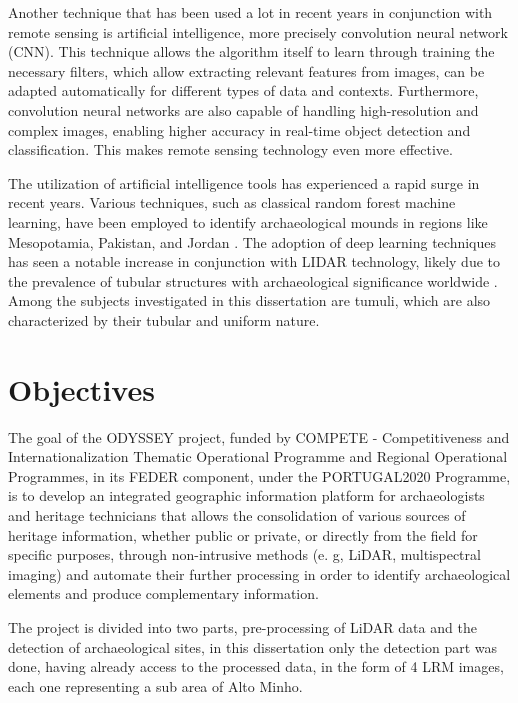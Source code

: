 Another technique that has been used a lot in recent years in conjunction with remote sensing is artificial intelligence, more precisely convolution neural network (CNN). This technique allows the algorithm itself to learn through training the necessary filters, which allow extracting relevant features from images, can be adapted automatically for different types of data and contexts. Furthermore, convolution neural networks are also capable of handling high-resolution and complex images, enabling higher accuracy in real-time object detection and classification. This makes remote sensing technology even more effective.




The utilization of artificial intelligence tools has experienced a rapid surge in recent years\cite{aumentoexpDL}. Various techniques, such as classical random forest machine learning, have been employed to identify archaeological mounds in regions like Mesopotamia, Pakistan, and Jordan \cite{LIDARCOMDL}. The adoption of deep learning techniques has seen a notable increase in conjunction with LIDAR technology, likely due to the prevalence of tubular structures with archaeological significance worldwide \cite{LIDARCOMDL}. Among the subjects investigated in this dissertation are tumuli, which are also characterized by their tubular and uniform nature.


\section{Objectives}
The goal of the ODYSSEY project, funded by COMPETE - Competitiveness and Internationalization Thematic Operational Programme and Regional Operational Programmes, in its FEDER component, under the PORTUGAL2020 Programme, is to develop an integrated geographic information platform for archaeologists and heritage technicians that allows the consolidation of various sources of heritage information, whether public or private, or directly from the field for specific purposes, through non-intrusive methods (e. g, LiDAR, multispectral imaging) and automate their further processing in order to identify archaeological elements and produce complementary information.

The project is divided into two parts, pre-processing of LiDAR data and the detection of archaeological sites, in this dissertation only the detection part was done, having already access to the processed data, in the form of 4 LRM images, each one representing a sub area of Alto Minho.

